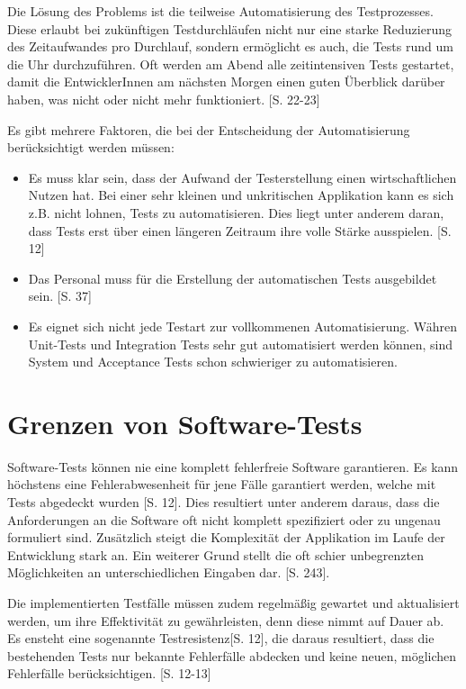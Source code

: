 \documentclass[a4paper,bibtotoc,oneside]{scrbook}
\begin{document}
Die Lösung des Problems ist die teilweise Automatisierung des Testprozesses. Diese erlaubt bei zukünftigen Testdurchläufen nicht nur eine starke Reduzierung des Zeitaufwandes pro Durchlauf, sondern ermöglicht es auch, die Tests rund um die Uhr durchzuführen. Oft werden am Abend alle zeitintensiven Tests gestartet, damit die EntwicklerInnen am nächsten Morgen einen guten Überblick darüber haben, was nicht oder nicht mehr funktioniert. \cite{test_auto}[S. 22-23]

Es gibt mehrere Faktoren, die bei der Entscheidung der Automatisierung berücksichtigt werden müssen:

\begin{itemize}
  \item Es muss klar sein, dass der Aufwand der Testerstellung einen wirtschaftlichen Nutzen hat. Bei einer sehr kleinen und unkritischen Applikation kann es sich z.B. nicht lohnen, Tests zu automatisieren. Dies liegt unter anderem daran, dass Tests erst über einen längeren Zeitraum ihre volle Stärke ausspielen. \cite{eval_regression}[S. 12]
  \item Das Personal muss für die Erstellung der automatischen Tests ausgebildet sein. \cite{eval_automat_webapp_test}[S. 37]
  \item Es eignet sich nicht jede Testart zur vollkommenen Automatisierung. Währen Unit-Tests und Integration Tests sehr gut automatisiert werden können, sind System und Acceptance Tests schon schwieriger zu automatisieren.
\end{itemize}


\section{Grenzen von Software-Tests}
Software-Tests können nie eine komplett fehlerfreie Software garantieren. Es kann höchstens eine Fehlerabwesenheit für jene Fälle garantiert werden, welche mit Tests abgedeckt wurden \cite{eval_regression}[S. 12]. Dies resultiert unter anderem daraus, dass die Anforderungen an die Software oft nicht komplett spezifiziert oder zu ungenau formuliert sind. Zusätzlich steigt die Komplexität der Applikation im Laufe der Entwicklung stark an. Ein weiterer Grund stellt die oft schier unbegrenzten Möglichkeiten an unterschiedlichen Eingaben dar. \cite{software_qual}[S. 243].

Die implementierten Testfälle müssen zudem regelmäßig gewartet und aktualisiert werden, um ihre Effektivität zu gewährleisten, denn diese nimmt auf Dauer ab. Es ensteht eine sogenannte \glqq Testresistenz\grqq\cite{eval_regression}[S. 12], die daraus resultiert, dass die bestehenden Tests nur bekannte Fehlerfälle abdecken und keine neuen, möglichen Fehlerfälle berücksichtigen. \cite{eval_regression}[S. 12-13]
\end{document}
